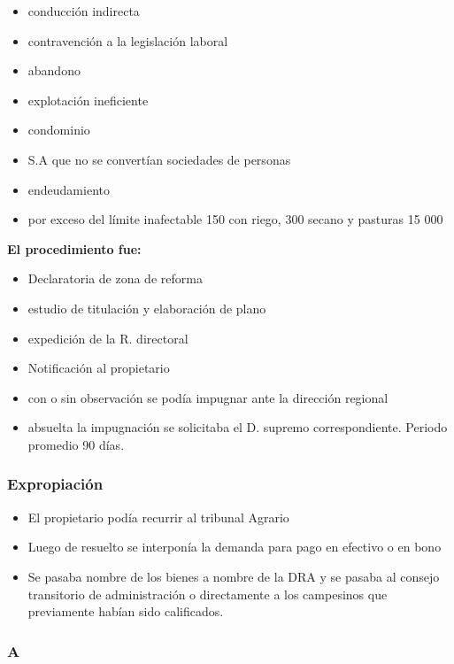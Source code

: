 \documentclass[
  a4paper,
]{article}
\providecommand{\tightlist}{%
  \setlength{\itemsep}{0pt}\setlength{\parskip}{0pt}}\usepackage{longtable,booktabs,array}
\begin{document}
\begin{itemize}
\tightlist
\item
  conducción indirecta
\item
  contravención a la legislación laboral
\item
  abandono
\item
  explotación ineficiente
\item
  condominio
\item
  S.A que no se convertían sociedades de personas
\item
  endeudamiento
\item
  por exceso del límite inafectable 150 con riego, 300 secano y pasturas
  15 000
\end{itemize}

\textbf{El procedimiento fue:}

\begin{itemize}
\tightlist
\item
  Declaratoria de zona de reforma
\item
  estudio de titulación y elaboración de plano
\item
  expedición de la R. directoral
\item
  Notificación al propietario
\item
  con o sin observación se podía impugnar ante la dirección regional
\item
  absuelta la impugnación se solicitaba el D. supremo correspondiente.
  Periodo promedio 90 días.
\end{itemize}

\hypertarget{expropiaciuxf3n}{%
\subsubsection{Expropiación}\label{expropiaciuxf3n}}

\begin{itemize}
\tightlist
\item
  El propietario podía recurrir al tribunal Agrario
\item
  Luego de resuelto se interponía la demanda para pago en efectivo o en
  bono
\item
  Se pasaba nombre de los bienes a nombre de la DRA y se pasaba al
  consejo transitorio de administración o directamente a los campesinos
  que previamente habían sido calificados.
\end{itemize}

\hypertarget{a}{%
\subsubsection{A}\label{a}}
\end{document}

